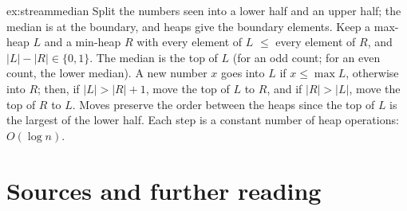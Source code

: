 \begin{solution}{ex:streammedian}
\idea Split the numbers seen into a lower half and an upper half; the median is at the boundary, and heaps give the boundary elements.
\writeup Keep a max-heap $L$ and a min-heap $R$ with every element of $L$ $\le$ every element of $R$, and $|L|-|R|\in\{0,1\}$. The median is the top of $L$ (for an odd count; for an even count, the
lower median). A new number $x$ goes into $L$ if $x\le\max L$, otherwise into $R$; then, if $|L|>|R|+1$, move the top of $L$ to $R$, and if $|R|>|L|$, move the top of $R$ to $L$. Moves preserve the
order between the heaps since the top of $L$ is the largest of the lower half. Each step is a constant number of heap operations: $O(\log n)$.
\end{solution}

\section*{Sources and further reading}

